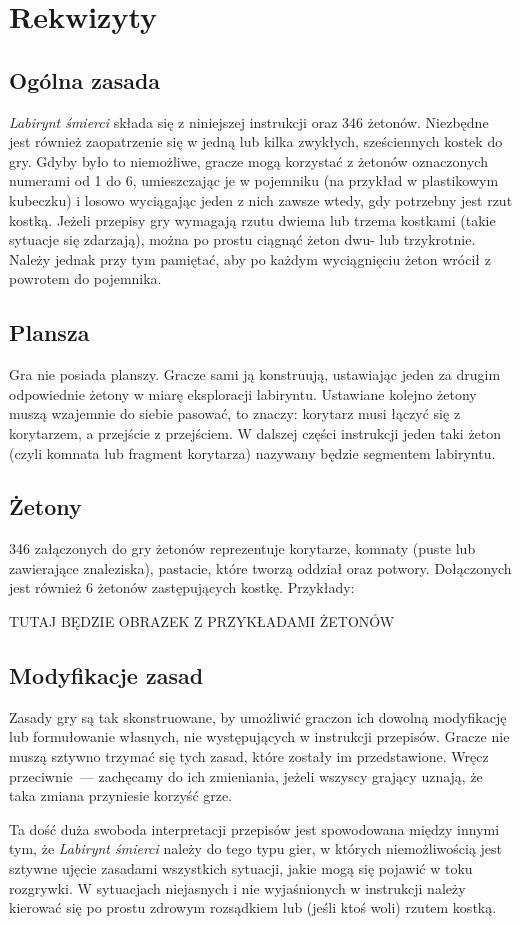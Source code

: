 \section{Rekwizyty}
\subsection{Ogólna zasada}
\textit{Labirynt śmierci} składa się z niniejszej instrukcji oraz 346 żetonów.
Niezbędne jest również zaopatrzenie się w jedną lub kilka zwykłych, sześciennych kostek do gry.
Gdyby było to niemożliwe, gracze mogą korzystać z żetonów oznaczonych numerami od 1 do 6, umieszczając je w pojemniku (na przykład w plastikowym kubeczku) i losowo wyciągając jeden z nich zawsze wtedy, gdy potrzebny jest rzut kostką.
Jeżeli przepisy gry wymagają rzutu dwiema lub trzema kostkami (takie sytuacje się zdarzają), można po prostu ciągnąć żeton dwu- lub trzykrotnie.
Należy jednak przy tym pamiętać, aby po każdym wyciągnięciu żeton wrócił z powrotem do pojemnika.

\subsection{Plansza}
Gra nie posiada planszy.
Gracze sami ją konstruują, ustawiając jeden za drugim odpowiednie żetony w miarę eksploracji labiryntu.
Ustawiane kolejno żetony muszą wzajemnie do siebie pasować, to znaczy: korytarz musi łączyć się z korytarzem, a przejście z przejściem.
W dalszej części instrukcji jeden taki żeton (czyli komnata lub fragment korytarza) nazywany będzie segmentem labiryntu.

\subsection{Żetony}
346 załączonych do gry żetonów reprezentuje korytarze, komnaty (puste lub zawierające znaleziska), pastacie, które tworzą oddział oraz potwory.
Dołączonych jest również 6 żetonów zastępujących kostkę. Przykłady:

TUTAJ BĘDZIE OBRAZEK Z PRZYKŁADAMI ŻETONÓW

\subsection{Modyfikacje zasad}
Zasady gry są tak skonstruowane, by umożliwić graczon ich dowolną modyfikację lub formułowanie własnych, nie występujących w instrukcji przepisów.
Gracze nie muszą sztywno trzymać się tych zasad, które zostały im przedstawione.
Wręcz przeciwnie~--- zachęcamy do ich zmieniania, jeżeli wszyscy grający uznają, że taka zmiana przyniesie korzyść grze.

Ta dość duża swoboda interpretacji przepisów jest spowodowana między innymi tym, że \textit{Labirynt śmierci} należy do tego typu gier, w których niemożliwością jest sztywne ujęcie zasadami wszystkich sytuacji, jakie mogą się pojawić w toku rozgrywki.
W sytuacjach niejasnych i nie wyjaśnionych w instrukcji należy kierować się po prostu zdrowym rozsądkiem lub (jeśli ktoś woli) rzutem kostką.

